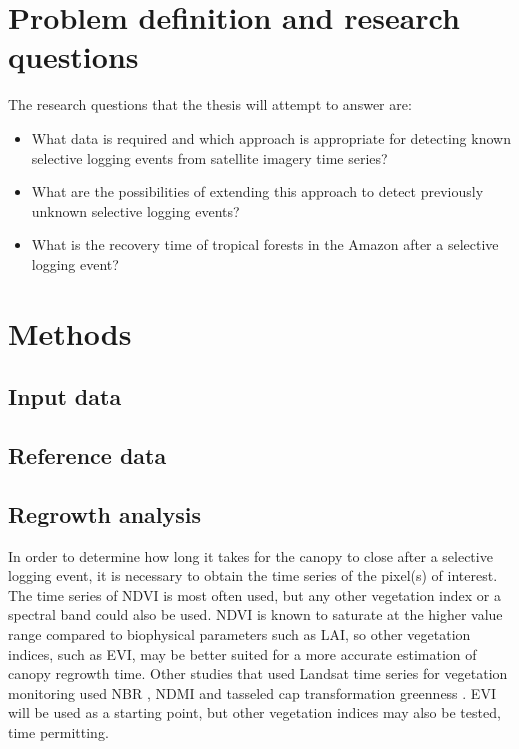 \documentclass[a4paper,10pt]{article}
\newcommand{\ndvi}{\ac{NDVI}}
\newcommand{\lai}{\ac{LAI}}
\newcommand{\evi}{\ac{EVI}}
\begin{document}
\section{Problem definition and research questions}

The research questions that the thesis will attempt to answer are:

\begin{itemize}
 \item What data is required and which approach is appropriate for detecting known selective logging events from satellite imagery time series?
 \item What are the possibilities of extending this approach to detect previously unknown selective logging events?
 \item What is the recovery time of tropical forests in the Amazon after a selective logging event?
\end{itemize}

\section{Methods}

\subsection{Input data}

\subsection{Reference data}

\subsection{Regrowth analysis}

In order to determine how long it takes for the canopy to close after a selective logging event, it is necessary to obtain the time series of the pixel(s) of interest. The time series of \ndvi{} is most often used, but any other vegetation index or a spectral band could also be used. \ndvi{} is known to saturate at the higher value range compared to biophysical parameters such as \lai{}, so other vegetation indices, such as \evi{}, may be better suited for a more accurate estimation of canopy regrowth time. Other studies that used Landsat time series for vegetation monitoring used \ac{NBR} \citep{schneibel_assessment_2017, shimizu_using_2017}, \ac{NDMI} \citep{dutrieux_reconstructing_2016} and tasseled cap transformation greenness \citep{powell_quantification_2010}. \evi{} will be used as a starting point, but other vegetation indices may also be tested, time permitting.
\end{document}
